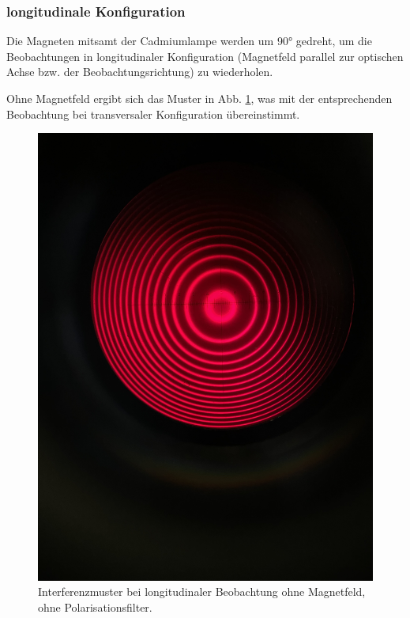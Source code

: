 \documentclass{article}
\begin{document}
\begin{multicols}{2}
\subsubsection{longitudinale Konfiguration}
Die Magneten mitsamt der Cadmiumlampe werden um \ang{90} gedreht,
um die Beobachtungen in longitudinaler Konfiguration (Magnetfeld parallel zur optischen Achse bzw. der Beobachtungsrichtung)
zu wiederholen.

Ohne Magnetfeld ergibt sich das Muster in Abb. \ref{fig:zeeman-longitudinal-ohne-ohne}, was mit der entsprechenden Beobachtung
bei transversaler Konfiguration übereinstimmt.
\begin{figure}[H]
  \centering
  \includegraphics[width=.8\linewidth]{zeeman-longitudinal-ohne-ohne}
  \caption{Interferenzmuster bei longitudinaler Beobachtung ohne Magnetfeld, ohne Polarisationsfilter.}
  \label{fig:zeeman-longitudinal-ohne-ohne}
\end{figure}


\end{multicols}
\end{document}
